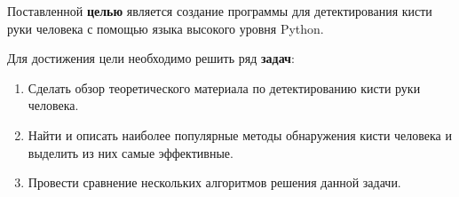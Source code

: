 
Поставленной {\bf целью} является создание программы для детектирования кисти руки человека с помощью 
языка высокого уровня Python.

Для достижения цели необходимо решить ряд {\bf задач}:
\begin{enumerate}
	\item Сделать обзор теоретического материала по детектированию кисти руки человека.
	\item Найти и описать наиболее популярные методы обнаружения кисти человека и выделить из них самые эффективные.
	\item Провести сравнение нескольких алгоритмов решения данной задачи.
\end{enumerate}